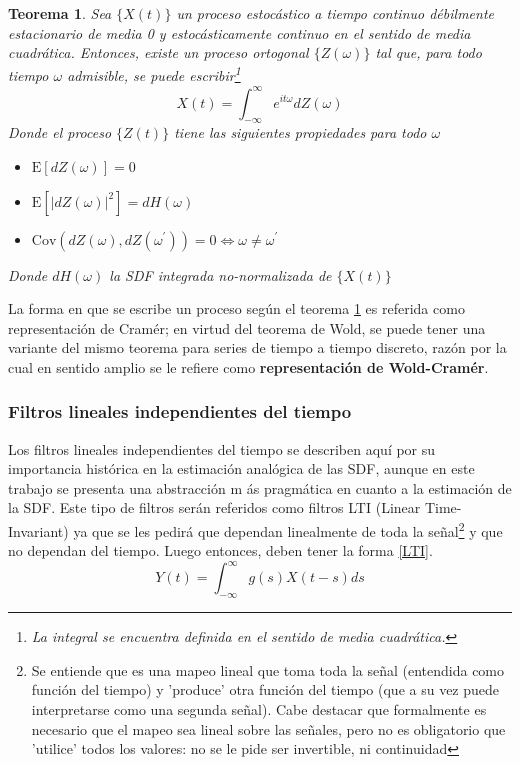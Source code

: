 \documentclass[12pt,a4paper]{mitthesis}
\newtheorem{thrm}{Teorema}
\newcommand{\intR}{\int_{-\infty}^{\infty}}
\newcommand{\E}[1]{\mathrm{E}\left[ #1 \right]}
\newcommand{\Cov}[1]{\mathrm{Cov}\left( #1 \right)}
\newcommand{\abso}[1]{\left| #1 \right|}
\begin{document}
\begin{thrm}
Sea $\{X(t)\}$ un proceso estoc\'astico a tiempo continuo d\'ebilmente estacionario de media 0 y 
estoc\'asticamente continuo en el sentido de media cuadr\'atica. Entonces, existe un proceso 
ortogonal $\{Z(\omega)\}$ tal que, para todo tiempo $\omega$ admisible, se puede 
escribir\footnote{La integral se encuentra definida en el sentido de media cuadr\'atica.}
\begin{equation*}
X(t) = \intR e^{i t \omega} dZ(\omega)
\end{equation*}
Donde el proceso $\{Z(t)\}$ tiene las siguientes propiedades para todo $\omega$
\begin{itemize}
\item $\E{dZ(\omega)} = 0$
\item $\E{\abso{dZ(\omega)}^{2}} = dH(\omega)$
\item $\Cov{dZ(\omega),dZ(\omega^{\prime})} = 0 \Leftrightarrow \omega \neq \omega^{\prime}$
\end{itemize}
Donde $dH(\omega)$ la SDF integrada no-normalizada de $\{X(t)\}$
\label{rep_espectral}
\end{thrm}

La forma en que se escribe un proceso seg\'un el teorema \ref{rep_espectral} es referida como
{representaci\'on de Cram\'er}; en virtud del teorema de Wold, se puede tener una variante del 
mismo teorema para series de tiempo a tiempo discreto, raz\'on por la cual en sentido amplio se le 
refiere como \textbf{representaci\'on de Wold-Cram\'er}.


\subsubsection{Filtros lineales independientes del tiempo}

Los filtros lineales independientes del tiempo se describen aqu\'i por su importancia hist\'orica 
en la estimaci\'on anal\'ogica de las SDF, aunque en este trabajo se presenta una abstracci\'on m
\'as pragm\'atica en cuanto a la estimaci\'on de la SDF.
Este tipo de filtros ser\'an referidos como filtros LTI (Linear Time-Invariant) ya que se les 
pedir\'a que dependan linealmente de toda la se\~nal\footnote{Se entiende que es una mapeo lineal 
que toma toda la se\~nal (entendida como funci\'on del tiempo) y 'produce' otra funci\'on del 
tiempo (que a su vez puede interpretarse como una segunda se\~nal). Cabe destacar que formalmente 
es necesario que el mapeo sea lineal sobre las se\~nales, pero no es obligatorio que 'utilice' 
todos los valores: no se le pide ser invertible, ni continuidad} y que no dependan del tiempo. 
Luego entonces, deben tener la forma \ref{LTI}.
\begin{equation*}
Y(t) = \intR g(s) X(t-s) ds
\label{LTI}
\end{equation*}
\end{document}
